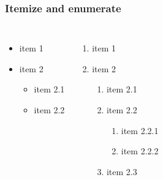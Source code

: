 \begin{frame}
	\frametitle{Itemize and enumerate}%
	\begin{columns}[t]
		\begin{itemize}
            \item item 1
            \item item 2
            \begin{itemize}
                \item item 2.1
                \item item 2.2
            \end{itemize}
        \end{itemize}
        \begin{enumerate}
            \item item 1
            \item item 2
            \begin{enumerate}
                \item item 2.1
                \item item 2.2
                \begin{enumerate}
                    \item item 2.2.1
                    \item item 2.2.2
                \end{enumerate}
                \item item 2.3 
            \end{enumerate}
        \end{enumerate}
	\end{columns}
\end{frame}